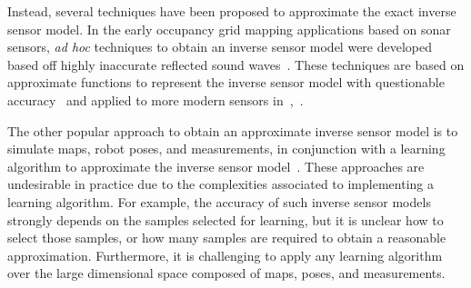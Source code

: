 \documentclass[letterpaper, 10pt, conference]{ieeeconf}
\begin{document}
Instead, several techniques have been proposed to approximate the exact inverse sensor model. %
In the early occupancy grid mapping applications based on sonar sensors, \emph{ad hoc} techniques to obtain an inverse sensor model were developed based off highly inaccurate  reflected sound waves~\cite{MorElf85,Elf89}.
These techniques are based on approximate functions to represent the inverse sensor model with questionable accuracy~\cite{ChoLynHutKanBurKavThr05} and applied to more modern sensors in~\cite{And09},~\cite{PirRutBisSch11}.

The other popular approach to obtain an approximate inverse sensor model is to simulate maps, robot poses, and measurements, in conjunction with a learning algorithm to approximate the inverse sensor model~\cite{ThrBurFox05,Thr01}. These approaches are undesirable in practice due to the complexities associated to implementing a learning algorithm. For example, the accuracy of such inverse sensor models strongly depends on the samples selected for learning, but it is unclear how to select those samples, or how many samples are required to obtain a reasonable approximation. Furthermore, it is challenging to apply any learning algorithm over the large dimensional space composed of maps, poses, and measurements. 




\end{document}
